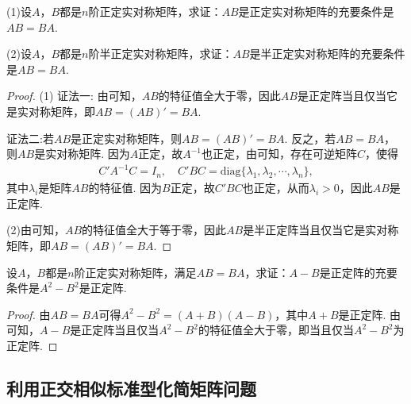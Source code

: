 \documentclass[../../main.tex]{subfiles}
\begin{document}
\begin{proposition}\label{proposition:例9.67}
(1)设\(A\)，\(B\)都是\(n\)阶正定实对称矩阵，求证：\(AB\)是正定实对称矩阵的充要条件是\(AB = BA\).

(2)设\(A\)，\(B\)都是\(n\)阶半正定实对称矩阵，求证：\(AB\)是半正定实对称矩阵的充要条件是\(AB = BA\).
\end{proposition}
\begin{proof}
(1)
{\color{blue}证法一:}
由可知，\(AB\)的特征值全大于零，因此\(AB\)是正定阵当且仅当它是实对称矩阵，即\(AB = (AB)' = BA\).

{\color{blue}证法二:}若\(AB\)是正定实对称矩阵，则\(AB=(AB)' = BA\). 反之，若\(AB = BA\)，则\(AB\)是实对称矩阵. 因为\(A\)正定，故\(A^{-1}\)也正定，由可知，存在可逆矩阵\(C\)，使得
\begin{align*}
C'A^{-1}C = I_n,\quad C'BC = \mathrm{diag}\{\lambda_1,\lambda_2,\cdots,\lambda_n\},
\end{align*}
其中\(\lambda_i\)是矩阵\(AB\)的特征值. 因为\(B\)正定，故\(C'BC\)也正定，从而\(\lambda_i>0\)，因此\(AB\)是正定阵. 

(2)由可知，\(AB\)的特征值全大于等于零，因此\(AB\)是半正定阵当且仅当它是实对称矩阵，即\(AB=(AB)' = BA\). 

\end{proof}

\begin{proposition}\label{proposition:例9.68}
设\(A\)，\(B\)都是\(n\)阶正定实对称矩阵，满足\(AB = BA\)，求证：\(A - B\)是正定阵的充要条件是\(A^2 - B^2\)是正定阵.
\end{proposition}
\begin{proof}
由\(AB = BA\)可得\(A^2 - B^2 = (A + B)(A - B)\)，其中\(A + B\)是正定阵. 由可知，\(A - B\)是正定阵当且仅当\(A^2 - B^2\)的特征值全大于零，即当且仅当\(A^2 - B^2\)为正定阵.

\end{proof}


\subsection{利用正交相似标准型化简矩阵问题}
\end{document}
